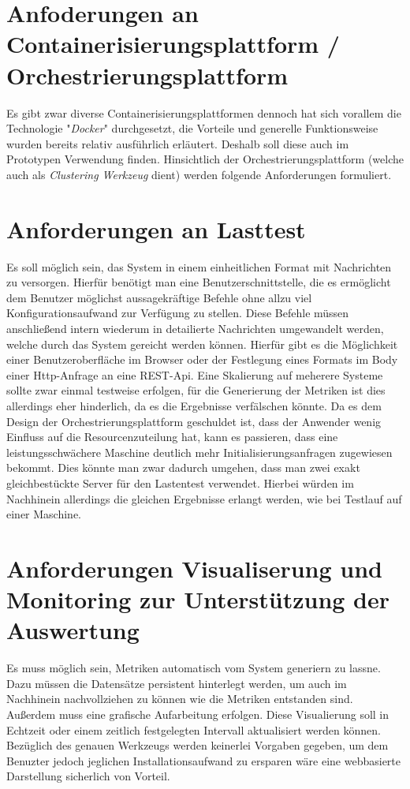 \section{Anfoderungen an Containerisierungsplattform / Orchestrierungsplattform}
Es gibt zwar diverse Containerisierungsplattformen  dennoch hat sich vorallem die Technologie "\emph{Docker}" durchgesetzt, die Vorteile und generelle Funktionsweise wurden bereits relativ ausführlich erläutert. Deshalb soll diese auch im Prototypen Verwendung finden. Hinsichtlich der Orchestrierungsplattform (welche auch als \emph{Clustering Werkzeug} dient) werden folgende Anforderungen formuliert. 

\section{Anforderungen an Lasttest}
Es soll möglich sein, das System in einem einheitlichen Format mit Nachrichten zu versorgen. Hierfür benötigt man eine Benutzerschnittstelle, die es ermöglicht dem Benutzer möglichst aussagekräftige Befehle ohne allzu viel Konfigurationsaufwand zur Verfügung zu stellen. Diese Befehle müssen anschließend intern wiederum in detailierte Nachrichten umgewandelt werden, welche durch das System gereicht werden können. Hierfür gibt es die Möglichkeit einer Benutzeroberfläche im Browser oder der Festlegung eines Formats im Body einer Http-Anfrage an eine REST-Api. Eine Skalierung auf meherere Systeme sollte zwar einmal testweise erfolgen, für die Generierung der Metriken ist dies allerdings eher hinderlich, da es die Ergebnisse verfälschen könnte. Da es dem Design der Orchestrierungsplattform geschuldet ist, dass der Anwender wenig Einfluss auf die Resourcenzuteilung hat, kann es passieren, dass eine leistungsschwächere Maschine deutlich mehr Initialisierungsanfragen zugewiesen bekommt. Dies könnte man zwar dadurch umgehen, dass man zwei exakt gleichbestückte Server für den Lastentest verwendet. Hierbei würden im Nachhinein allerdings die gleichen Ergebnisse erlangt werden, wie bei Testlauf auf einer Maschine.

\section{Anforderungen Visualiserung und Monitoring zur Unterstützung der Auswertung}
Es muss möglich sein, Metriken automatisch vom System generiern zu lassne. Dazu müssen die Datensätze persistent hinterlegt werden, um auch im Nachhinein nachvollziehen zu können wie die Metriken entstanden sind. Außerdem muss eine grafische Aufarbeitung erfolgen. Diese Visualierung soll in Echtzeit oder einem zeitlich festgelegten Intervall aktualisiert werden können. Bezüglich des genauen Werkzeugs werden keinerlei Vorgaben gegeben, um dem Benuzter jedoch jeglichen Installationsaufwand zu ersparen wäre eine webbasierte Darstellung sicherlich von Vorteil.
